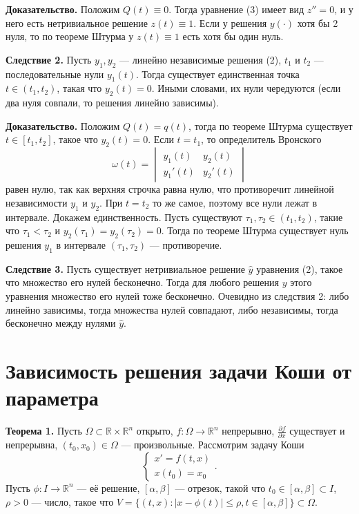 \textbf{Доказательство.} Положим $Q(t) \equiv 0$. Тогда уравнение (3) имеет вид $z'' = 0$, и у него есть нетривиальное решение $z(t) \equiv 1$.
Если у решения $y(\cdot)$ хотя бы 2 нуля, то по теореме Штурма у $z(t) \equiv 1$ есть хотя бы один нуль.

\QED

\textbf{Следствие 2.} Пусть $y_1, y_2$ --- линейно независимые решения (2), $t_1$ и $t_2$ --- последовательные нули $y_1(t)$.
Тогда существует единственная точка $t \in (t_1, t_2)$, такая что $y_2(t) = 0$.
Иными словами, их нули чередуются (если два нуля совпали, то решения линейно зависимы).

\textbf{Доказательство.} Положим $Q(t) = q(t)$, тогда по теореме Штурма существует $t \in [t_1, t_2]$, такое что $y_2(t) = 0$.
Если $t = t_1$, то определитель Вронского
\[
    \omega(t) = 
    \begin{vmatrix}
        y_1(t) & y_2(t) \\
        y_1'(t) & y_2'(t)
    \end{vmatrix}
\]
равен нулю, так как верхняя строчка равна нулю, что противоречит линейной независимости $y_1$ и $y_2$.
При $t = t_2$ то же самое, поэтому все нули лежат в интервале.
Докажем единственность.
Пусть существуют $\tau_1, \tau_2 \in (t_1, t_2)$, такие что $\tau_1 < \tau_2$ и $y_2(\tau_1) = y_2(\tau_2) = 0$.
Тогда по теореме Штурма существует нуль решения $y_1$ в интервале $(\tau_1, \tau_2)$ --- противоречие.

\QED

\textbf{Следствие 3.} Пусть существует нетривиальное решение $\widehat y$ уравнения (2), такое что множество его нулей бесконечно.
Тогда для любого решения $y$ этого уравнения множество его нулей тоже бесконечно.
Очевидно из следствия 2: либо линейно зависимы, тогда множества нулей совпадают, либо независимы, тогда бесконечно между нулями $\widehat y$.

\section{Зависимость решения задачи Коши от параметра}
\textbf{Теорема 1.} Пусть $\Omega \subset \mathbb R \times \mathbb R^n$ открыто, $f: \Omega \to \mathbb R^n$ непрерывно, $\frac{\partial f}{\partial x}$ существует и непрерывна, $(t_0, x_0) \in \Omega$ --- произвольные.
Рассмотрим задачу Коши
\[
    \begin{cases}
        x' = f(t, x) \\
        x(t_0) = x_0
    \end{cases} .
\]
Пусть $\phi: I \to \mathbb R^n$ --- её решение, $[\alpha, \beta]$ --- отрезок, такой что $t_0 \in [\alpha, \beta] \subset I$, $\rho > 0$ --- число, такое что $V = \{(t, x): |x - \phi(t)| \le \rho, t \in [\alpha, \beta]\} \subset \Omega$.

